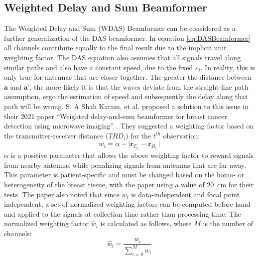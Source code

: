 \subsection{Weighted Delay and Sum Beamformer}
The Weighted Delay and Sum (WDAS) Beamformer can be considered as a further generalization of the DAS beamformer. In
equation \ref{eq:DASBeamformer} all channels contribute equally to the final result due to the implicit unit weighting
factor. The DAS equation also assumes that all signals travel along similar paths and also have a constant speed, due to
the fixed $\varepsilon_i$. In reality, this is only true for antennas that are closer together. The greater the distance
between $\textbf{a}$ and $\textbf{a'}$, the more likely it is that the waves deviate from the straight-line path
assumption, ergo the estimation of speed and subsequently the delay along that path will be wrong. S. A Shah Karam, et
al. proposed a solution to this issue in their 2021 paper ``Weighted delay-and-sum beamformer for breast cancer
detection using microwave imaging'' \cite{shahkaramWeightedDelayandsumBeamformer2021}. They suggested a weighting factor
based on the transmitter-receiver distance ($TRD_i$) for the $t^{th}$ observation:
\begingroup
\large
\begin{equation}
    w_i = \alpha -  \lvert \textbf{r}_{T_{r_i}} - \textbf{r}_{R_{c_i}} \rvert
\end{equation}
\endgroup
$\alpha$ is a positive parameter that allows the above weighting factor to reward signals from nearby antennas while
penalizing signals from antennas that are far away. This parameter is patient-specific and must be changed based on the
homo- or heterogeneity of the breast tissue, with the paper using a value of $20$~cm for their tests. The paper also
noted that since $w_i$ is data-independent and focal point independent, a set of normalized weighting factors can be
computed before hand and applied to the signals at collection time rather than processing time. The normalized weighting
factor $\hat{w}_i$ is calculated as follows, where $M$ is the number of channels:
\begingroup
\large
\begin{equation}
    \hat{w}_i = \frac{w_i}{\sum_{i=0}^{M} w_i}
\end{equation} 
\endgroup
